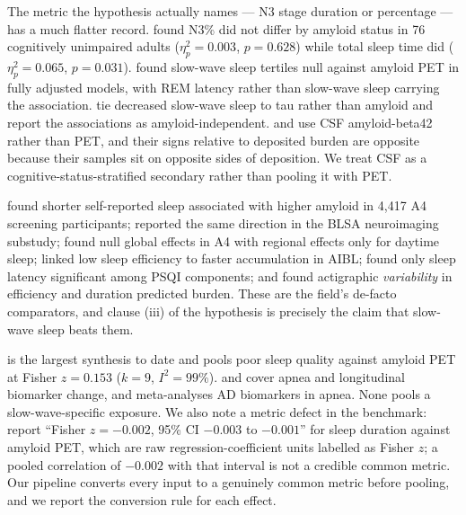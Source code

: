  The metric the hypothesis actually names --- N3 stage
duration or percentage --- has a much flatter record. \citet{montagne2026} found N3\% did not
differ by amyloid status in 76 cognitively unimpaired adults ($\eta_p^2 = 0.003$, $p = 0.628$)
while total sleep time did ($\eta_p^2 = 0.065$, $p = 0.031$). \citet{jin2025} found slow-wave
sleep tertiles null against amyloid PET in fully adjusted models, with REM latency rather than
slow-wave sleep carrying the association. \citet{stankeviciute2024} tie decreased slow-wave
sleep to tau rather than amyloid and report the associations as amyloid-independent.
\citet{varga2016} and \citet{liguori2020} use CSF amyloid-beta42 rather than PET, and their
signs relative to deposited burden are opposite because their samples sit on opposite sides of
deposition. We treat CSF as a cognitive-status-stratified secondary rather than pooling it with
PET.

 \citet{winer2021}
found shorter self-reported sleep associated with higher amyloid in 4{,}417 A4 screening
participants; \citet{spira2013} reported the same direction in the BLSA neuroimaging substudy;
\citet{insel2021} found null global effects in A4 with regional effects only for daytime sleep;
\citet{pivac2024} linked low sleep efficiency to faster accumulation in AIBL; \citet{brown2016}
found only sleep latency significant among PSQI components; and \citet{fenton2023} found
actigraphic \emph{variability} in efficiency and duration predicted burden. These are the
field's de-facto comparators, and clause (iii) of the hypothesis is precisely the claim that
slow-wave sleep beats them.

 \citet{chen2025} is the largest synthesis to date and pools poor
sleep quality against amyloid PET at Fisher $z = 0.153$ ($k = 9$, $I^2 = 99\%$).
\citet{bubu2019} and \citet{bubu2020} cover apnea and longitudinal biomarker change, and
\citet{cui2022} meta-analyses AD biomarkers in apnea. None pools a slow-wave-specific exposure.
We also note a metric defect in the benchmark: \citet{chen2025} report ``Fisher $z = -0.002$,
95\% CI $-0.003$ to $-0.001$'' for sleep duration against amyloid PET, which are raw
regression-coefficient units labelled as Fisher $z$; a pooled correlation of $-0.002$ with that
interval is not a credible common metric. Our pipeline converts every input to a genuinely
common metric before pooling, and we report the conversion rule for each effect.

